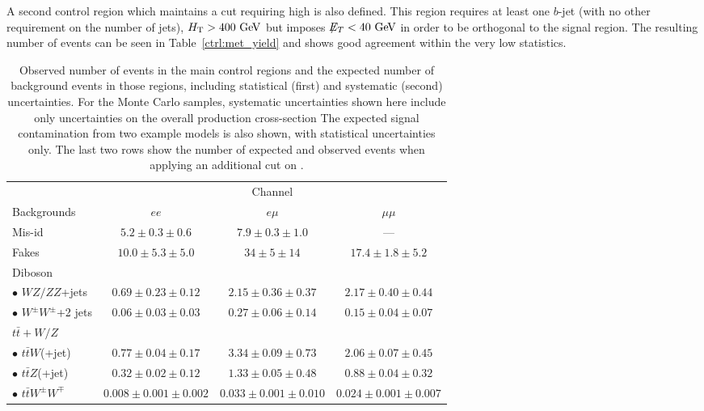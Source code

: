 A second control region which maintains a cut requiring high \HT{} is also defined.
This region requires at least one $b$-jet (with no other requirement on the number of jets), $\HT>400 \GeV$ but imposes $\met<40 \GeV$ in order to be orthogonal to the signal region. 
The resulting number of events can be seen in Table~\ref{ctrl:met_yield} and shows good agreement within the very low statistics.


\begin{table}[p]
  \begin{center}
    \caption{Observed number of events in the main control regions and the expected number of background events in those regions, including statistical (first) and systematic (second) uncertainties.
        For the Monte Carlo samples, systematic uncertainties shown here include only uncertainties on the overall production cross-section
        The expected signal contamination from two example models is also shown, with statistical uncertainties only. 
        The last two rows show the number of expected and observed events when applying an additional cut on \met{}.}\label{ctrl:ht2j_yield}
    \begin{tabular}{l|c|c|c}
      \hline\hline
       & \multicolumn{3}{c}{Channel} \\
      \cline{2-4}
      Backgrounds & $ee$ & $e\mu$ & $\mu\mu$ \\
      \hline
      Mis-id & $5.2\pm 0.3 \pm 0.6$ & $7.9\pm 0.3 \pm 1.0$ & --- \\
      Fakes & $10.0\pm 5.3 \pm 5.0$ & $34\pm 5 \pm 14$ & $17.4\pm 1.8 \pm 5.2$ \\
      \hline
      Diboson & & & \\
      $\bullet$ $WZ/ZZ$+jets & $0.69\pm 0.23 \pm 0.12$ & $2.15\pm 0.36\pm 0.37$ & $2.17\pm 0.40\pm 0.44$ \\
      $\bullet$ $W^{\pm}W^\pm$+2 jets & $0.06\pm 0.03\pm 0.03$ & $0.27\pm 0.06\pm 0.14$ & $0.15\pm 0.04\pm 0.07$ \\
      \hline
      $t\bar{t}+W/Z$ & & & \\
      $\bullet$ $t\bar{t}W$(+jet) & $0.77\pm 0.04\pm 0.17$ & $3.34\pm 0.09\pm 0.73$ & $2.06\pm 0.07\pm 0.45$ \\
      $\bullet$ $t\bar{t}Z$(+jet) & $0.32\pm 0.02\pm 0.12$ & $1.33\pm 0.05\pm 0.48$ & $0.88\pm 0.04\pm 0.32$ \\
      $\bullet$ $t\bar{t}W^{\pm}W^\mp$ & $0.008\pm 0.001\pm 0.002$ & $0.033\pm 0.001\pm 0.010$ & $0.024\pm 0.001\pm 0.007$ \\

\end{tabular}
\end{center}
\end{table}
